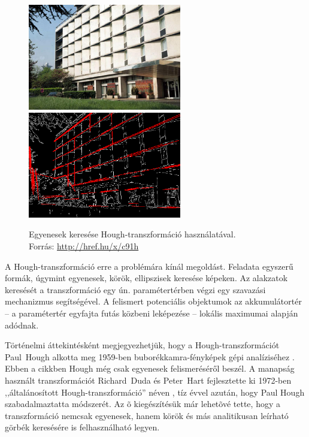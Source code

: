 \begin{figure}[!ht]
\centering
\includegraphics[width=67mm, keepaspectratio]{figures/houghline_building_1.png}\hspace{1cm}
\includegraphics[width=67mm, keepaspectratio]{figures/houghline_building_2.png}
\caption{Egyenesek keresése Hough-transzformáció használatával.\\Forrás: \url{http://href.hu/x/c91h}}
\label{fig:houghlines}
\end{figure}

A Hough-transzformáció erre a problémára kínál megoldást. Feladata egyszerű formák, úgymint egyenesek, körök, ellipszisek keresése képeken. Az alakzatok keresését a transzformáció egy ún. paramétertérben végzi egy szavazási mechanizmus segítségével. A felismert potenciális objektumok az akkumulátortér -- a paramétertér egyfajta futás közbeni leképezése -- lokális maximumai alapján adódnak.

\bigskip

Történelmi áttekintésként megjegyezhetjük, hogy a Hough-transzformációt Paul~Hough alkotta meg 1959-ben buborékkamra-fényképek gépi analíziséhez \cite{hough_eredeti}. Ebben a cikkben Hough még csak egyenesek felismeréséről beszél. A manapság használt transzformációt Richard~Duda és Peter~Hart fejlesztette ki 1972-ben ,,általánosított Hough-transzformáció'' néven \cite{hough_duda}, tíz évvel azután, hogy Paul Hough szabadalmaztatta módszerét. Az õ kiegészítésük már lehetõvé tette, hogy a transzformáció nemcsak egyenesek, hanem körök és más analitikusan leírható görbék keresésére is felhasználható legyen.

